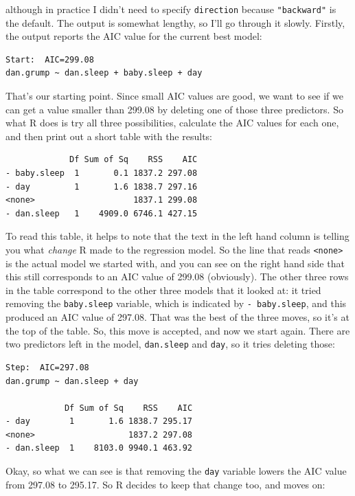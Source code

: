 \documentclass[
]{book}
\begin{document}
although in practice I didn't need to specify \texttt{direction} because \texttt{"backward"} is the default. The output is somewhat lengthy, so I'll go through it slowly. Firstly, the output reports the AIC value for the current best model:

\begin{verbatim}
Start:  AIC=299.08
dan.grump ~ dan.sleep + baby.sleep + day
\end{verbatim}

That's our starting point. Since small AIC values are good, we want to see if we can get a value smaller than 299.08 by deleting one of those three predictors. So what R does is try all three possibilities, calculate the AIC values for each one, and then print out a short table with the results:

\begin{verbatim}
             Df Sum of Sq    RSS    AIC
- baby.sleep  1       0.1 1837.2 297.08
- day         1       1.6 1838.7 297.16
<none>                    1837.1 299.08
- dan.sleep   1    4909.0 6746.1 427.15
\end{verbatim}

To read this table, it helps to note that the text in the left hand column is telling you what \emph{change} R made to the regression model. So the line that reads \texttt{\textless{}none\textgreater{}} is the actual model we started with, and you can see on the right hand side that this still corresponds to an AIC value of 299.08 (obviously). The other three rows in the table correspond to the other three models that it looked at: it tried removing the \texttt{baby.sleep} variable, which is indicated by \texttt{-\ baby.sleep}, and this produced an AIC value of 297.08. That was the best of the three moves, so it's at the top of the table. So, this move is accepted, and now we start again. There are two predictors left in the model, \texttt{dan.sleep} and \texttt{day}, so it tries deleting those:

\begin{verbatim}
Step:  AIC=297.08
dan.grump ~ dan.sleep + day

            Df Sum of Sq    RSS    AIC
- day        1       1.6 1838.7 295.17
<none>                   1837.2 297.08
- dan.sleep  1    8103.0 9940.1 463.92
\end{verbatim}

Okay, so what we can see is that removing the \texttt{day} variable lowers the AIC value from 297.08 to 295.17. So R decides to keep that change too, and moves on:
\end{document}
